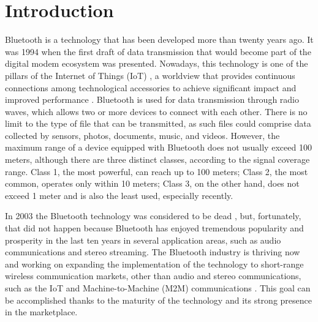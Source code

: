 \documentclass[12pt, draftclsnofoot, onecolumn]{IEEEtran}
\begin{document}
%
\IEEEpeerreviewmaketitle

\section{Introduction}
\label{sec:introduction}

Bluetooth is a technology that has been developed more than twenty years ago. It was 1994 when the first draft of data transmission that would become part of the digital modem ecosystem was presented. Nowadays, this technology is one of the pillars of the Internet of Things (IoT) \cite{7000963}, a worldview that provides continuous connections among technological accessories to achieve significant impact and improved performance \cite{7253713}. Bluetooth is used for data transmission through radio waves, which allows two or more devices to connect with each other. There is no limit to the type of file that can be transmitted, as such files could comprise data collected by sensors, photos, documents, music, and videos. However, the maximum range of a device equipped with Bluetooth does not usually exceed 100 meters, although there are three distinct classes, according to the signal coverage range. Class 1, the most powerful, can reach up to 100 meters; Class 2, the most common, operates only within 10 meters; Class 3, on the other hand, does not exceed 1 meter and is also the least used, especially recently.

In 2003 the Bluetooth technology was considered to be dead \cite{dead}, but, fortunately, that did not happen because Bluetooth has enjoyed tremendous popularity and prosperity in the last ten years in several application areas, such as audio communications and stereo streaming. The Bluetooth industry is thriving now and working on expanding the implementation of the technology to short-range wireless communication markets, other than audio and stereo communications, such as the IoT and Machine-to-Machine (M2M) communications \cite{7516570}. This goal can be accomplished thanks to the maturity of the technology and its strong presence in the marketplace.
\end{document}
